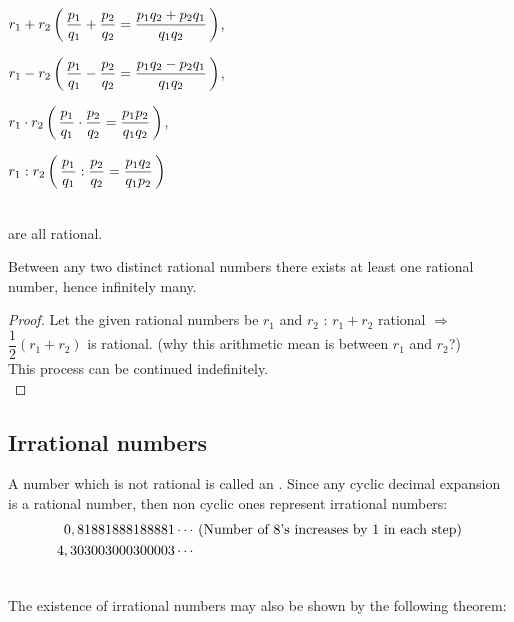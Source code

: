 \documentclass[11pt]{amsbook}
\begin{document}

\centerline{\thepage}
\bigskip

\begin{hEnumerateRoman}
	
	\item 
	$r_{1}+r_{2}  
	 \left( \, \dfrac{p_{1}}{q_{1}} 
		+ \dfrac{p_{2}}{q_{2}}
		= \dfrac{p_{1} q_{2} + p_{2} q_{1}}
		{q_{1} q_{2}} \, \right) $,
	
	\item 
	$r_{1}-r_{2} 
	 \left( \, \dfrac{p_{1}}{q_{1}} 
		- \dfrac{p_{2}}{q_{2}}
		= \dfrac{p_{1} q_{2} - p_{2} q_{1}}
		{q_{1} q_{2}} \, \right) $,
	
	\item 
	$r_{1} \cdot r_{2}
	 \left( \, \dfrac{p_{1}}{q_{1}} 
		\cdot \dfrac{p_{2}}{q_{2}}
		= \dfrac{p_{1} p_{2}}
		{q_{1} q_{2}} \, \right) $,
	
	\item 
	$r_{1}:r_{2}
	 \left( \, \dfrac{p_{1}}{q_{1}} 
		: \dfrac{p_{2}}{q_{2}}
		= \dfrac{p_{1} q_{2}}
		{q_{1} p_{2}} \, \right) $
	\\
	\\
\end{hEnumerateRoman} 
are all rational.
\\

\begin{cor}
Between any two distinct rational numbers 
there exists at least one rational number, 
hence infinitely many.
\\

\begin{proof}\renewcommand{\qedsymbol}{}
	Let the given rational numbers be $r_{1}$ and $r_{2}$ :
	$r_{1} + r_{2}$ rational 
	$\Longrightarrow$ 
	$\dfrac{1}{2}(r_{1} + r_{2})$ is rational.
	(why this arithmetic mean is between $r_{1}$ and $r_{2}$?) 
	\\
	This process can be continued indefinitely.
	\\
\end{proof}
\end{cor}

\subsection{Irrational numbers}
\label{subsec:IrrationalNumbers}

A number which is not rational is called an 
. 
Since any cyclic decimal expansion is a rational number, 
then non cyclic ones represent irrational numbers:
\\
\begin{align*}
0,81881888188881\cdots 
&\text{ (Number of 8's increases by 1 in each step)} \\ \bigskip
4,303003000300003\cdots \\
&
\end{align*}

The existence of irrational numbers may also be shown 
by the following theorem:

\end{document}
